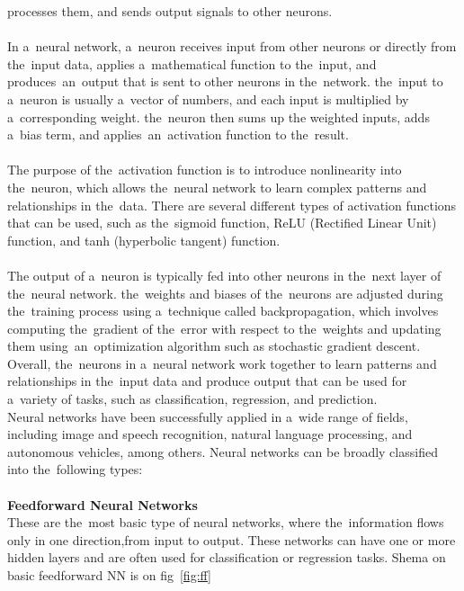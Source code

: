 processes them, and sends output signals to other neurons.\\
\\
In a~neural network, a~neuron receives input from other neurons or directly from the~input data, applies a~mathematical
function to the~input, and produces~an~output that is sent to other neurons in the~network. the~input to a~neuron is
usually a~vector of numbers, and each input is multiplied by a~corresponding weight. the~neuron then sums up the
weighted inputs, adds a~bias term, and applies~an~activation function to the~result.\\
\\
The purpose of the~activation function is to introduce nonlinearity into the~neuron, which allows the~neural network
to learn complex patterns and relationships in the~data. There are several different types of activation functions
that can be used, such as the~sigmoid function, ReLU (Rectified Linear Unit) function, and tanh (hyperbolic tangent)
function.\\
\\
The output of a~neuron is typically fed into other neurons in the~next layer of the~neural network. the~weights and
biases of the~neurons are adjusted during the~training process using a~technique called backpropagation, which involves
computing the~gradient of the~error with respect to the~weights and updating them using~an~optimization algorithm such
as stochastic gradient descent.\\
Overall, the~neurons in a~neural network work together to learn patterns and relationships in the~input data and produce
output that can be used for a~variety of tasks, such as classification, regression, and prediction.\\
Neural networks have been successfully applied in a~wide range of fields, including image and speech recognition, natural language processing, and autonomous vehicles, among others.
Neural networks can be broadly classified into the~following types:\\
\\
\textbf{Feedforward Neural Networks}\\
These are the~most basic type of neural networks, where the~information flows
only in one direction,from input to output. These networks can have one or more hidden layers and are often used for classification or regression tasks. Shema on basic feedforward NN is on fig~\ref{fig:ff}
